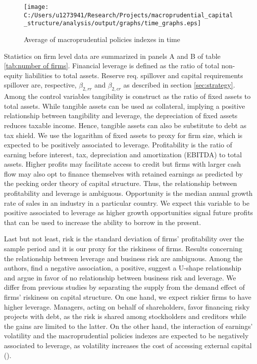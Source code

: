 \documentclass[12pt]{article}
\begin{document}
		\begin{figure}[h!]
		\centering
		\caption{Average of macroprudential policies indexes in time}
		\texttt{[image: C:/Users/u1273941/Research/Projects/macroprudential\_capital\_structure/analysis/output/graphs/time\_graphs.eps]}
		\label{fig:time graph}
	\end{figure}
	
	Statistics on firm level data are summarized in panels A and B of table \ref{tab:number of firms}. Financial leverage is defined as the ratio of total non-equity liabilities to total assets. Reserve req. spillover and capital requirements spillover are, respective, $\beta_{2,rr}$ and $\beta_{2,cr}$ as described in section \ref{sec:strategy}. Among the control variables tangibility is construct as the ratio of fixed assets to total assets. While tangible assets can be used as collateral, implying a positive relationship between tangibility and leverage, the depreciation of fixed assets reduces taxable income. Hence, tangible assets can also be substitute to debt as tax shield. We use the logarithm of fixed assets to proxy for firm size, which is expected to be positively associated to leverage. Profitability is the ratio of earning before interest, tax, depreciation and amortization (EBITDA) to total assets. Higher profits may facilitate access to credit but firms with larger cash flow may also opt to finance themselves with retained earnings as predicted by the pecking order theory of capital structure. Thus, the relationship between profitability and leverage is ambiguous. Opportunity is the median annual growth rate of sales in an industry in a particular country. We expect this variable to be positive associated to leverage as higher growth opportunities signal future profits that can be used to increase the ability to borrow in the present. 
	   
		\begin{small}
		{
			
		}
	\end{small}

Last but not least, risk is the standard deviation of firms' profitability over the sample period and it is our proxy for the riskiness of firms. Results concerning the relationship between leverage and business risk are ambiguous. Among the authors, \cite*{bradley1984existence} find a negative association, \cite*{bennett1993determinants} a positive, \cite*{kale1991effect} suggest a U-shape relationship and \cite{titman1988determinants} argue in favor of no relationship between business risk and leverage. We differ from previous studies by separating the supply from the demand effect of firms' riskiness on capital structure. On one hand, we expect riskier firms to have higher leverage.  Managers, acting on behalf of shareholders, favor financing risky projects with debt, as the risk is shared among stockholders and creditors while the gains are limited to the latter. On the other hand, the interaction of earnings' volatility and the macroprudential policies indexes are expected to be negatively associated to leverage, as volatility increases the cost of accessing external capital (\cite{minton1999impact}).
\end{document}
